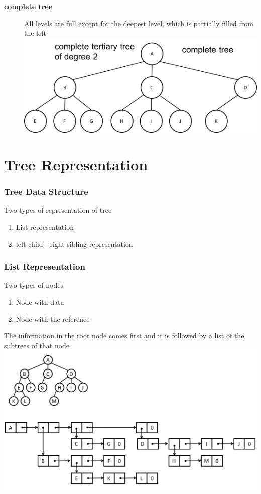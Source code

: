 \documentclass[newPxFont,sthlmFooter,nooffset]{beamer}
\begin{document}
\begin{frame}[t, allowframebreaks]
\begin{description}
\item[\textbf{complete tree}] All levels are full except for the deepest level, which is partially filled from the left\\
\includegraphics[height=0.3\textheight]{./figures/fig02_def_complete.png}
  \end{description}
\end{frame}

\section{Tree Representation}

\begin{frame}[t]
  \frametitle{Tree Data Structure}
Two types of representation of tree
  \begin{enumerate}
  \item List representation
  \item left child - right sibling representation
  \end{enumerate}
\end{frame}


\begin{frame}[t]
  \frametitle{List Representation}
Two types of nodes
  \begin{enumerate}
  \item Node with data
  \item Node with the reference
  \end{enumerate}

The information in the root node comes first and it is followed by a list of the subtrees of that node
\includegraphics[height=0.6\textheight]{figures/fig03_list_rep.png}
\end{frame}
\end{document}
